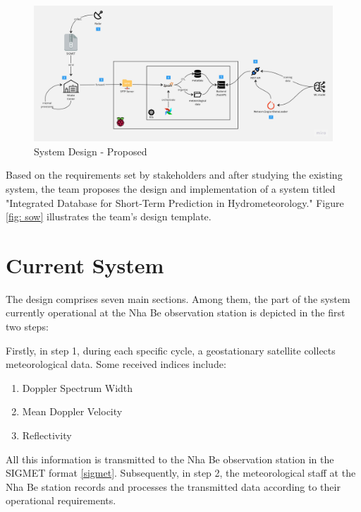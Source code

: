 \begin{figure}[H]
    \centering
    \includegraphics[width=\linewidth]{Images/4.1-architecture.jpg}
    \vspace{1em}
    \caption{System Design - Proposed}
    \label{fig:sow}
\end{figure}
\vspace{0.5cm}
Based on the requirements set by stakeholders and after studying the existing system, the team proposes the design and implementation of a system titled "Integrated Database for Short-Term Prediction in Hydrometeorology." Figure \ref{fig: sow} illustrates the team's design template.
\newpage
\section{Current System}
The design comprises seven main sections. Among them, the part of the system currently operational at the Nha Be observation station is depicted in the first two steps:

Firstly, in step 1, during each specific cycle, a geostationary satellite collects meteorological data. Some received indices include:
\begin{enumerate}
    \item Doppler Spectrum Width
    \item Mean Doppler Velocity
    \item Reflectivity
\end{enumerate}

All this information is transmitted to the Nha Be observation station in the SIGMET format \ref{sigmet}. Subsequently, in step 2, the meteorological staff at the Nha Be station records and processes the transmitted data according to their operational requirements.
